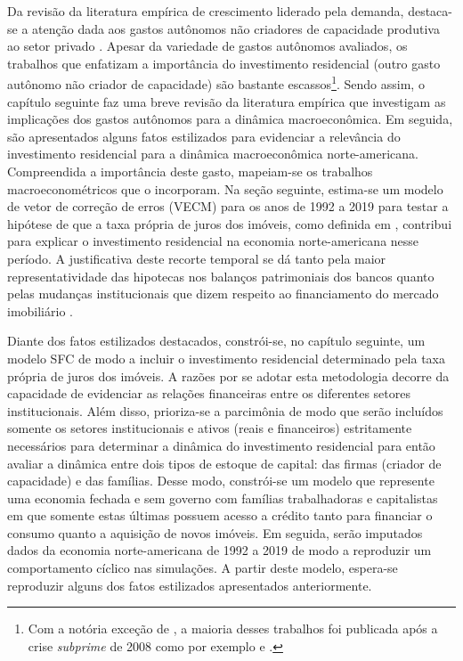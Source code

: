 Da revisão da literatura empírica de crescimento liderado pela demanda, destaca-se a atenção dada aos gastos autônomos não criadores de capacidade produtiva ao setor privado \cites{girardi_long-run_2016}{girardi_autonomous_2018}{freitas_pattern_2013}{braga_investment_2018}. Apesar da variedade de gastos autônomos avaliados, os trabalhos que enfatizam a importância do investimento residencial (outro gasto autônomo não criador de capacidade) são bastante escassos\footnote{Com a notória exceção de \textcite{leamer_housing_2007}, a maioria desses trabalhos foi publicada após a crise \textit{subprime} de 2008 como por exemplo \textcite{jorda_great_2014} e \textcite{fiebiger_semi-autonomous_2018}.}. 
Sendo assim, o capítulo seguinte faz uma breve revisão da literatura empírica que investigam as implicações dos gastos autônomos para a dinâmica macroeconômica.
Em seguida, são apresentados alguns fatos estilizados para evidenciar a relevância do investimento residencial para a dinâmica macroeconômica norte-americana.
Compreendida a importância deste gasto, mapeiam-se os trabalhos macroeconométricos que o incorporam.
Na seção seguinte, estima-se um modelo de vetor de correção de erros (VECM) para os anos de 1992 a 2019 para testar a hipótese de que  a taxa própria de juros dos imóveis, como definida em \textcite{teixeira_crescimento_2015}, 
contribui para explicar o investimento residencial na economia norte-americana nesse período. 
A justificativa deste recorte temporal se dá tanto pela maior representatividade das hipotecas nos balanços patrimoniais dos bancos \cite{jorda_great_2014} quanto pelas mudanças institucionais que dizem respeito ao financiamento do mercado imobiliário \cites{federal_deposit_insurance_corporation_savings_1997}{mishkin_evaluating_1997}{wall_too_2010}.


Diante dos fatos estilizados destacados, constrói-se, no capítulo seguinte, um modelo SFC de modo a incluir o investimento residencial determinado pela taxa própria de juros dos imóveis. 
A razões por se adotar esta metodologia decorre da capacidade de evidenciar as relações financeiras entre os diferentes setores institucionais. 
Além disso, prioriza-se a parcimônia de modo que serão incluídos somente os setores institucionais e ativos (reais e financeiros) estritamente necessários para determinar a dinâmica do investimento residencial para então avaliar a dinâmica entre dois tipos de estoque de capital: das firmas (criador de capacidade) e das famílias. 
Desse modo, constrói-se um modelo que represente uma economia fechada e sem governo
com famílias trabalhadoras e capitalistas em que somente estas últimas possuem acesso a crédito tanto para financiar o consumo quanto a aquisição de novos imóveis.
Em seguida, serão imputados dados da economia norte-americana de 1992 a 2019 de modo a reproduzir um comportamento cíclico nas simulações.
A partir deste modelo, espera-se reproduzir alguns dos fatos estilizados apresentados anteriormente.

